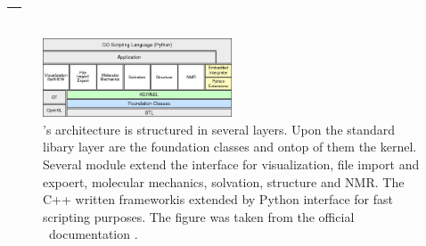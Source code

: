 \section{\ball --  \ballFull}
\label{sec:ball}


\begin{figure}[t]
	\centerline{\includegraphics[width=0.5\textwidth]{gfx/BALL-architecture.jpeg}}
	\caption{\ball's architecture is structured in several layers. Upon the standard libary layer are the foundation classes and ontop of them the kernel. Several module extend the interface for visualization, file import and expoert, molecular mechanics, solvation, structure and NMR. The C++ written frameworkis extended by Python interface for fast scripting purposes. The figure was taken from the official \ball\ documentation \cite{BALLTutorial}.}
	\label{fig:ball_architecture}
\end{figure}




